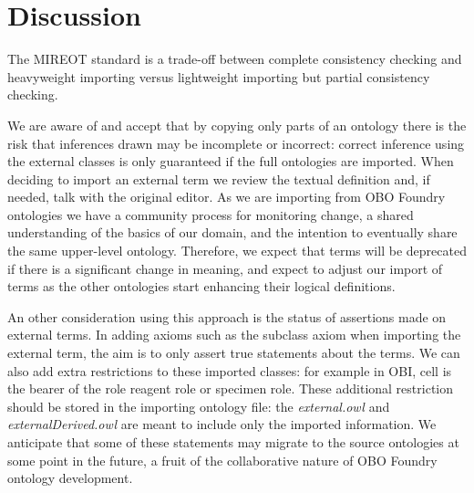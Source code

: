 \documentclass{elsart3p}    %
\begin{document}



\section*{Discussion}

The MIREOT standard is a trade-off between complete consistency checking and heavyweight importing versus lightweight importing but partial consistency checking.

We are aware of and accept that by copying only parts of an ontology there is the risk that inferences drawn may be incomplete or incorrect: correct inference using the external classes is only guaranteed if the full ontologies are imported.
When deciding to import an external term we review the textual definition and, if needed, talk with the original editor.
As we are importing from OBO Foundry ontologies we have a community process for monitoring change, a shared understanding of the basics of our domain, and the intention to eventually share the same upper-level ontology. Therefore, we expect that terms will be deprecated if there is a significant change in meaning, and expect to adjust our import of terms as the other ontologies start enhancing their logical definitions.


An other consideration using this approach is the status of assertions made on external terms.
In adding axioms such as the subclass axiom when importing the external term, the aim is to only assert true statements about the terms.
We can also add extra restrictions to these imported classes: for example in OBI, cell is the bearer of the role reagent role or specimen role. 
These additional restriction should be stored in the importing ontology file: the \emph{external.owl} and \emph{externalDerived.owl} are meant to include only the imported information.
We anticipate that some of these statements may migrate to the source ontologies at some point in the future, a fruit of the collaborative nature of OBO Foundry ontology development. 
\end{document}
